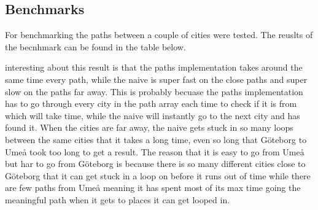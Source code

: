 \documentclass[a4paper,11pt]{article}
\begin{document}
\subsection*{Benchmarks}
For benchmarking the paths between a couple of cities were tested. The reuslts of the becnhmark can be found in the table below.
\begin{table}[h]
    \begin{center}
    \caption{The result of the paths between different cities}
    \label{tab:table1}
    \end{center}
\end{table}
interesting about this result is that the paths implementation takes around the same time every path, while the 
naive is super fast on the close paths and super slow on the paths far away. This is probably becuase the paths implementation has to go through 
every city in the path array each time to check if it is from which will take time, while the naive will instantly go to the next city and has found it. When the cities are far away, the naive gets stuck in so many loops between the same cities that 
it takes a long time, even so long that Göteborg to Umeå took too long to get a result. The reason that it is easy to go from Umeå but har to go from Göteborg is because there is so many different cities close to Göteborg that it can get stuck in a loop on before it runs out of time while there are few paths from Umeå meaning it 
has spent most of its max time going the meaningful path when it gets to places it can get looped in. 
\end{document}

